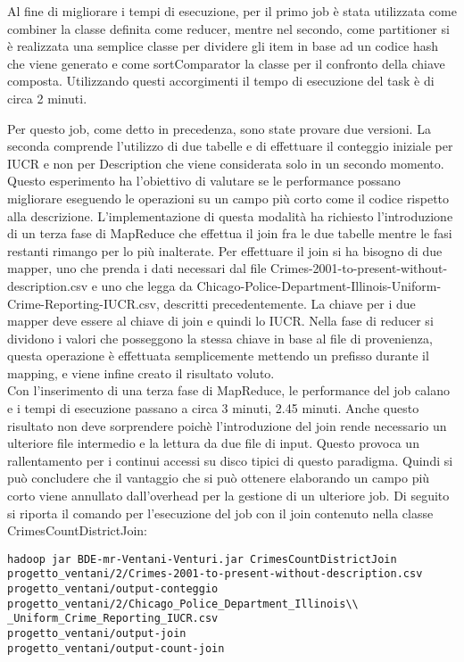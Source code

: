 \documentclass[10pt]{article}
\begin{document}
Al fine di migliorare i tempi di esecuzione, per il primo job è stata utilizzata come combiner la classe definita come reducer, mentre nel secondo, come partitioner si è realizzata una semplice classe per dividere gli item in base ad un codice hash che viene generato e come sortComparator la classe per il confronto della chiave composta.
Utilizzando questi accorgimenti il tempo di esecuzione del task è di circa 2 minuti.

Per questo job, come detto in precedenza, sono state provare due versioni. La seconda comprende l'utilizzo di due tabelle e di effettuare il conteggio iniziale per IUCR e non per Description che viene considerata solo in un secondo momento. Questo esperimento ha l'obiettivo di valutare se le performance possano migliorare eseguendo le operazioni su un campo più corto come il codice rispetto alla descrizione.
L'implementazione di questa modalità ha richiesto l'introduzione di un terza fase di MapReduce che effettua il join fra le due tabelle mentre  le fasi restanti rimango per lo più inalterate. Per effettuare il join si ha bisogno di due mapper, uno che prenda i dati necessari dal file 
Crimes-2001-to-present-without-description.csv e uno che legga da Chicago-Police-Department-Illinois-Uniform-Crime-Reporting-IUCR.csv, descritti precedentemente. La chiave per i due mapper deve essere al chiave di join e quindi lo IUCR. Nella fase di reducer si dividono i valori che posseggono la stessa chiave in base al file di provenienza, questa operazione è effettuata semplicemente mettendo un prefisso durante il mapping, e viene infine creato il risultato voluto. \\
Con l'inserimento di una terza fase di MapReduce, le performance del job calano e i tempi di esecuzione passano a circa 3 minuti, 2.45 minuti.
Anche questo risultato non deve sorprendere poichè l'introduzione del join rende necessario un ulteriore file intermedio e la lettura da due file di input. Questo provoca un rallentamento per i continui accessi su disco tipici di questo paradigma. Quindi si può concludere che il vantaggio che si può ottenere elaborando un campo più corto viene annullato dall'overhead per la gestione di un ulteriore job.
Di seguito si riporta il comando per l'esecuzione del job con il join contenuto nella classe CrimesCountDistrictJoin:
\begin{lstlisting}
hadoop jar BDE-mr-Ventani-Venturi.jar CrimesCountDistrictJoin 
progetto_ventani/2/Crimes-2001-to-present-without-description.csv 
progetto_ventani/output-conteggio 
progetto_ventani/2/Chicago_Police_Department_Illinois\\
_Uniform_Crime_Reporting_IUCR.csv
progetto_ventani/output-join   
progetto_ventani/output-count-join
\end{lstlisting}
\end{document}
